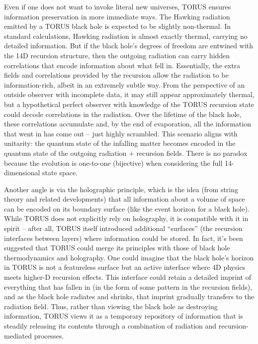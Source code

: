\documentclass[]{article}
\begin{document}
Even if one does not want to invoke literal new universes, TORUS ensures
information preservation in more immediate ways. The Hawking radiation
emitted by a TORUS black hole is expected to be slightly non-thermal. In
standard calculations, Hawking radiation is almost exactly thermal,
carrying no detailed information. But if the black hole's degrees of
freedom are entwined with the 14D recursion structure, then the outgoing
radiation can carry hidden correlations that encode information about
what fell in. Essentially, the extra fields and correlations provided by
the recursion allow the radiation to be information-rich, albeit in an
extremely subtle way. From the perspective of an outside observer with
incomplete data, it may still appear approximately thermal, but a
hypothetical perfect observer with knowledge of the TORUS recursion
state could decode correlations in the radiation. Over the lifetime of
the black hole, these correlations accumulate and, by the end of
evaporation, all the information that went in has come out -- just
highly scrambled. This scenario aligns with unitarity: the quantum state
of the infalling matter becomes encoded in the quantum state of the
outgoing radiation + recursion fields. There is no paradox because the
evolution is one-to-one (bijective) when considering the full
14-dimensional state space.

Another angle is via the holographic principle, which is the idea (from
string theory and related developments) that all information about a
volume of space can be encoded on its boundary surface (like the event
horizon for a black hole). While TORUS does not explicitly rely on
holography, it is compatible with it in spirit -- after all, TORUS
itself introduced additional ``surfaces'' (the recursion interfaces
between layers) where information could be stored. In fact, it's been
suggested that TORUS could merge its principles with those of black hole
thermodynamics and holography. One could imagine that the black hole's
horizon in TORUS is not a featureless surface but an active interface
where 4D physics meets higher-D recursion effects. This interface could
retain a detailed imprint of everything that has fallen in (in the form
of some pattern in the recursion fields), and as the black hole radiates
and shrinks, that imprint gradually transfers to the radiation field.
Thus, rather than viewing the black hole as destroying information,
TORUS views it as a temporary repository of information that is steadily
releasing its contents through a combination of radiation and
recursion-mediated processes.
\end{document}

